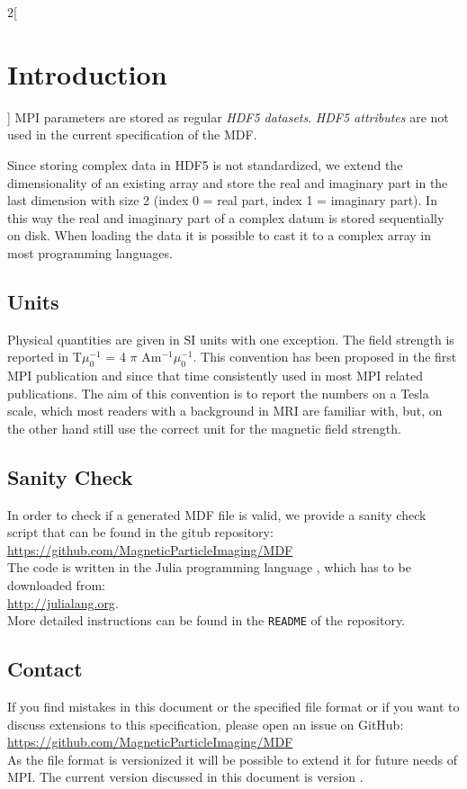 \documentclass[landscape]{article} %
\begin{document}
\begin{multicols}{2}[\section{Introduction} \label{Sec:Introduction}]
MPI parameters are stored as regular \textit{HDF5 datasets}. \textit{HDF5 attributes} are not used in the current specification of the MDF.

Since storing complex data in HDF5 is not standardized, we extend the dimensionality of an existing array and store the real and imaginary part in the last dimension with size 2 (index 0 = real part, index 1 = imaginary part). In this way the real and imaginary part of a complex datum is stored sequentially on disk. When loading the data it is possible to cast it to a complex array in most programming languages.

\subsection{Units}

Physical quantities are given in SI units with one exception. The field strength is reported in T$\mu_0^{-1}$ = 4 $\pi$ Am$^{-1}\mu_0^{-1}$. This convention has been proposed in the first MPI publication and since that time consistently used in most MPI related publications. The aim of this convention is to report the numbers on a Tesla scale, which most readers with a background in MRI are familiar with, but, on the other hand still use the correct unit for the magnetic field strength.


\subsection{Sanity Check}

In order to check if a generated MDF file is valid, we provide a sanity check script that can be found in the gitub repository:\\
\hspace*{1cm}\url{https://github.com/MagneticParticleImaging/MDF}\\
The code is written in the Julia programming language \cite{Bezanson2012,Bezanson2014,Bezanson2014a}, which has to be downloaded from: \\
\hspace*{1cm} \url{http://julialang.org}.\\
More detailed instructions can be found in the \texttt{README} of the repository.

\subsection{Contact}

If you find mistakes in this document or the specified file format or if you want to discuss extensions to this specification, please open an issue on GitHub:\\
\hspace*{1cm}\url{https://github.com/MagneticParticleImaging/MDF}\\
As the file format is versionized it will be possible to extend it for future needs of MPI. The current version discussed in this document is version \version.


\end{multicols}
\end{document}
